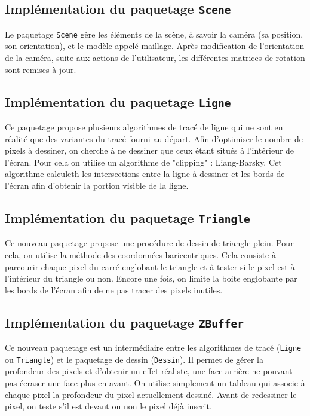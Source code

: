 \documentclass[10pt]{article}
\begin{document}
\subsection{Implémentation du paquetage {\tt Scene}}
Le paquetage {\tt Scene} gère les éléments de la scène, à savoir la caméra (sa position, son orientation), et le modèle appelé maillage.
Après modification de l'orientation de la caméra, suite aux actions de l'utilisateur, les différentes matrices de rotation sont remises à jour.

\subsection{Implémentation du paquetage {\tt Ligne}}
Ce paquetage propose plusieurs algorithmes de tracé de ligne qui ne sont en réalité que des variantes du tracé fourni au départ.
Afin d'optimiser le nombre de pixels à dessiner, on cherche à ne dessiner que ceux étant situés à l'intérieur de l'écran.
Pour cela on utilise un algorithme de "clipping" : Liang-Barsky. Cet algorithme calculeth les intersections entre la ligne à dessiner et les bords de l'écran afin d'obtenir la portion visible de la ligne.

\subsection{Implémentation du paquetage {\tt Triangle}}
Ce nouveau paquetage propose une procédure de dessin de triangle plein. Pour cela, on utilise la méthode des coordonnées baricentriques.
Cela consiste à parcourir chaque pixel du carré englobant le triangle et à tester si le pixel est à l'intérieur du triangle ou non.
Encore une fois, on limite la boite englobante par les bords de l'écran afin de ne pas tracer des pixels inutiles.

\subsection{Implémentation du paquetage {\tt ZBuffer}}
Ce nouveau paquetage est un intermédiaire entre les algorithmes de tracé ({\tt Ligne} ou {\tt Triangle})
et le paquetage de dessin ({\tt Dessin}). Il permet de gérer la profondeur des pixels et d'obtenir un effet réaliste, une face arrière ne pouvant pas écraser une face plus en avant.
On utilise simplement un tableau qui associe à chaque pixel la profondeur du pixel actuellement dessiné. Avant de redessiner le pixel, on teste s'il est devant ou non le pixel déjà inscrit.
\end{document}
